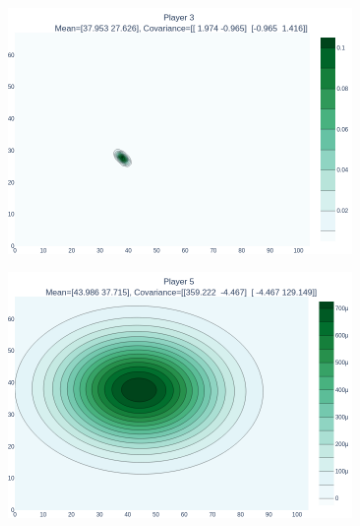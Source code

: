 \documentclass[14pt,a4]{article}
\begin{document}
\begin{figure}[h]
\begin{subfigure}{0.3\linewidth}
    \end{subfigure}
    \hfill
    \begin{subfigure}{0.3\linewidth}
        \centering
        \includegraphics[scale=0.1]{images/q6/partb/3.png}
    \end{subfigure}
    \newline
    \begin{subfigure}{0.3\linewidth}
        \centering
        \includegraphics[scale=0.1]{images/q6/partb/5.png}
    \end{subfigure}
    \hfill
    \begin{subfigure}{0.3\linewidth}
        \centering

\end{subfigure}
\end{figure}
\end{document}
